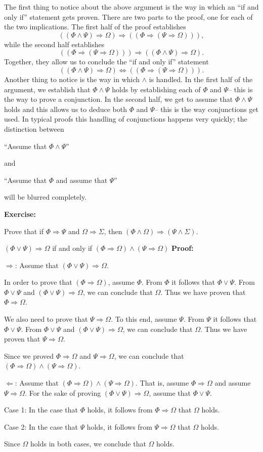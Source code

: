 \documentclass[12pt]{article}
\newcommand{\AND}{\wedge}
\newcommand{\OR}{\vee}
\newcommand{\ARR}{\Rightarrow}
\newcommand{\DARR}{\Leftrightarrow}
\newcommand{\ex}[1]{\textbf{Exercise:}\begin{adjustwidth}{2em}{}#1\end{adjustwidth}}
\newcommand{\DRULEPF}[3]{\begin{tcolorbox}[title=Derived Rule: #1,colbacktitle=white,coltitle=black,colback=white] {#2} \tcblower \textbf{Proof:} {#3} \end{tcolorbox}}
\def\pA{\Phi}
\def\pB{\Psi}
\def\pC{\Omega}
\def\pD{\Sigma}
\begin{document}
The first thing to notice about the above argument is the way in which an ``if and only if'' statement gets proven.
There are two parts to the proof, one for each of the two implications.
The first half of the proof establishes 
$$((\pA\AND\pB)\ARR\pC)\ARR((\pA\ARR(\pB\ARR\pC))),$$
while the second half establishes
$$((\pA\ARR(\pB\ARR\pC)))\ARR((\pA\AND\pB)\ARR\pC).$$
Together, they allow us to conclude the ``if and only if'' statement
$$((\pA\AND\pB)\ARR\pC)\DARR((\pA\ARR(\pB\ARR\pC))).$$
Another thing to notice is the way in which $\AND$ is handled.
In the first half of the argument, we establish that $\pA\AND\pB$ holds by establishing each of $\pA$ and $\pB$-- this is the way to prove a conjunction.
In the second half, we get to assume that $\pA\AND\pB$ holds and this allows us to deduce both $\pA$ and $\pB$-- this is the way conjunctions get used.
In typical proofs this handling of conjunctions happens very quickly; the distinction between
\begin{center} ``Assume that $\pA\AND\pB$''\end{center}
and
\begin{center} ``Assume that $\pA$ and assume that $\pB$''\end{center}
will be blurred completely.

\ex{Prove that if $\pA\ARR\pB$ and $\pC\ARR\pD$, then $(\pA\AND\pC)\ARR(\pB\AND\pD)$.}

\DRULEPF{Disjunction and Implication}{
$(\pA\OR\pB)\ARR\pC$ if and only if $(\pA\ARR\pC)\AND(\pB\ARR\pC)$
}{
$\Rightarrow$:
Assume that $(\pA\OR\pB)\ARR\pC$.
\lsp

In order to prove that $(\pA\ARR\pC)$, assume $\pA$.
From $\pA$ it follows that $\pA\OR\pB$.
From $\pA\OR\pB$ and $(\pA\OR\pB)\ARR\pC$, we can conclude that $\pC$.
Thus we have proven that $\pA\ARR\pC$.
\lsp

We also need to prove that $\pB\ARR\pC$. To this end, assume $\pB$.
From $\pB$ it follows that $\pA\OR\pB$.
From $\pA\OR\pB$ and $(\pA\OR\pB)\ARR\pC$, we can conclude that $\pC$.
Thus we have proven that $\pB\ARR\pC$.
\lsp

Since we proved $\pA\ARR\pC$ and $\pB\ARR\pC$, we can conclude that $(\pA\ARR\pC)\AND(\pB\ARR\pC)$.
\lsp

$\Leftarrow$: 
Assume that $(\pA\ARR\pC)\AND(\pB\ARR\pC)$.
That is, assume  $\pA\ARR\pC$ and assume $\pB\ARR\pC$.
For the sake of proving $(\pA\OR\pB)\ARR\pC$, assume that $\pA\OR\pB$.
\lsp

Case 1: In the case that $\pA$ holds, it follows from $\pA\ARR\pC$ that $\pC$ holds.
\lsp

Case 2: In the case that $\pB$ holds, it follows from $\pB\ARR\pC$ that $\pC$ holds.
\lsp

Since $\pC$ holds in both cases, we conclude that $\pC$ holds.
}
\end{document}
